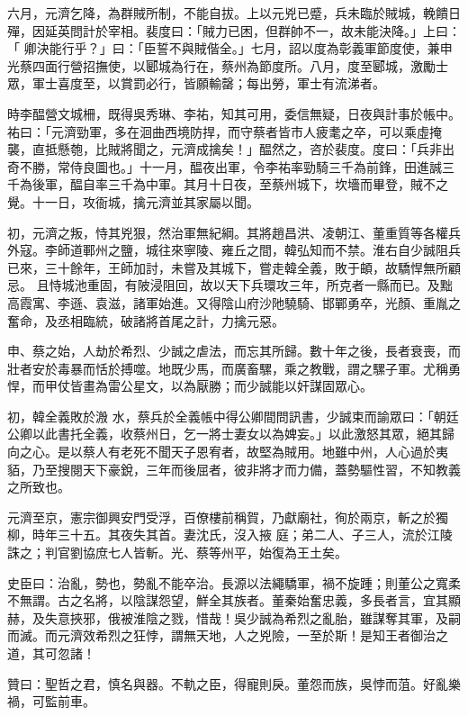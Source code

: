 \begin{pinyinscope}
 六月，元濟乞降，為群賊所制，不能自拔。上以元兇已蹙，兵未臨於賊城，輓饋日殫，因延英問計於宰相。裴度曰：「賊力已困，但群帥不一，故未能決降。」上曰：「
 卿決能行乎？」曰：「臣誓不與賊偕全。」七月，詔以度為彰義軍節度使，兼申光蔡四面行營招撫使，以郾城為行在，蔡州為節度所。八月，度至郾城，激勵士眾，軍士喜度至，以賞罰必行，皆願輸罄；每出勞，軍士有流涕者。



 時李醖營文城柵，既得吳秀琳、李祐，知其可用，委信無疑，日夜與計事於帳中。祐曰：「元濟勁軍，多在洄曲西境防捍，而守蔡者皆市人疲耄之卒，可以乘虛掩襲，直抵懸匏，比賊將聞之，元濟成擒矣！」醖然之，咨於裴度。度曰：「兵非出
 奇不勝，常侍良圖也。」十一月，醖夜出軍，令李祐率勁騎三千為前鋒，田進誠三千為後軍，醖自率三千為中軍。其月十日夜，至蔡州城下，坎墻而畢登，賊不之覺。十一日，攻衙城，擒元濟並其家屬以聞。



 初，元濟之叛，恃其兇狠，然治軍無紀綱。其將趙昌洪、凌朝江、董重質等各權兵外寇。李師道鄆州之鹽，城往來寧陵、雍丘之間，韓弘知而不禁。淮右自少誠阻兵已來，三十餘年，王師加討，未嘗及其城下，嘗走韓全義，敗于頔，故驕悍無所顧忌。
 且恃城池重固，有陂浸阻回，故以天下兵環攻三年，所克者一縣而已。及黜高霞寓、李遜、袁滋，諸軍始進。又得陰山府沙阤驍騎、邯鄲勇卒，光顏、重胤之奮命，及丞相臨統，破諸將首尾之計，力擒元惡。



 申、蔡之始，人劫於希烈、少誠之虐法，而忘其所歸。數十年之後，長者衰喪，而壯者安於毒暴而恬於搏噬。地既少馬，而廣畜騾，乘之教戰，謂之騾子軍。尤稱勇悍，而甲仗皆畫為雷公星文，以為厭勝；而少誠能以奸謀固眾心。



 初，韓全義敗於溵
 水，蔡兵於全義帳中得公卿間問訊書，少誠束而諭眾曰：「朝廷公卿以此書托全義，收蔡州日，乞一將士妻女以為婢妄。」以此激怒其眾，絕其歸向之心。是以蔡人有老死不聞天子恩宥者，故堅為賊用。地雖中州，人心過於夷貊，乃至搜閱天下豪銳，三年而後屈者，彼非將才而力備，蓋勢驅性習，不知教義之所致也。



 元濟至京，憲宗御興安門受浮，百僚樓前稱賀，乃獻廟社，徇於兩京，斬之於獨柳，時年三十五。其夜失其首。妻沈氏，沒入掖
 庭；弟二人、子三人，流於江陵誅之；判官劉協庶七人皆斬。光、蔡等州平，始復為王土矣。



 史臣曰：治亂，勢也，勢亂不能卒治。長源以法繩驕軍，禍不旋踵；則董公之寬柔不無謂。古之名將，以陰謀怨望，鮮全其族者。董秦始奮忠義，多長者言，宜其顯赫，及失意挾邪，俄被淮陰之戮，惜哉！吳少誠為希烈之亂胎，雖謀奪其軍，及嗣而滅。而元濟效希烈之狂悖，謂無天地，人之兇險，一至於斯！是知王者御治之道，其可忽諸！



 贊曰：聖哲之君，慎名與器。不軌之臣，得寵則戾。董怨而族，吳悖而菹。好亂樂禍，可監前車。



\end{pinyinscope}